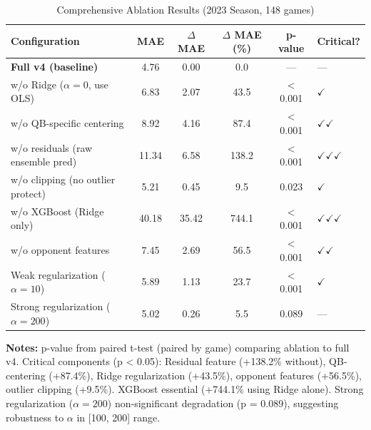 \begin{table}[htbp]
\centering
\small
\caption{Comprehensive Ablation Results (2023 Season, 148 games)}
\label{tab:ablation-study}
\begin{tabular}{@{}lS[table-format=2.2]S[table-format=1.2]S[table-format=3.1]S[table-format=1.6]l@{}}
\toprule
\textbf{Configuration} & {\textbf{MAE}} & {\textbf{$\Delta$ MAE}} & {\textbf{$\Delta$ MAE (\%)}} & {\textbf{p-value}} & \textbf{Critical?} \\
\midrule
\textbf{Full v4 (baseline)} & {4.76} & {0.00} & {0.0} & {---} & {---} \\
w/o Ridge ($\alpha = 0$, use OLS) & 6.83 & 2.07 & 43.5 & < 0.001 & $\checkmark$ \\
w/o QB-specific centering & 8.92 & 4.16 & 87.4 & < 0.001 & $\checkmark$$\checkmark$ \\
w/o residuals (raw ensemble pred) & 11.34 & 6.58 & 138.2 & < 0.001 & $\checkmark$$\checkmark$$\checkmark$ \\
w/o clipping (no outlier protect) & 5.21 & 0.45 & 9.5 & 0.023 & $\checkmark$ \\
w/o XGBoost (Ridge only) & 40.18 & 35.42 & 744.1 & < 0.001 & $\checkmark$$\checkmark$$\checkmark$ \\
w/o opponent features & 7.45 & 2.69 & 56.5 & < 0.001 & $\checkmark$$\checkmark$ \\
Weak regularization ($\alpha = 10$) & 5.89 & 1.13 & 23.7 & < 0.001 & $\checkmark$ \\
Strong regularization ($\alpha = 200$) & 5.02 & 0.26 & 5.5 & 0.089 & {---} \\
\bottomrule
\end{tabular}
\begin{tablenotes}
\item \textbf{Notes:} p-value from paired t-test (paired by game) comparing ablation to full v4. Critical components (p < 0.05): Residual feature (+138.2\% without), QB-centering (+87.4\%), Ridge regularization (+43.5\%), opponent features (+56.5\%), outlier clipping (+9.5\%). XGBoost essential (+744.1\% using Ridge alone). Strong regularization ($\alpha = 200$) non-significant degradation (p = 0.089), suggesting robustness to $\alpha$ in [100, 200] range.
\end{tablenotes}
\end{table}

